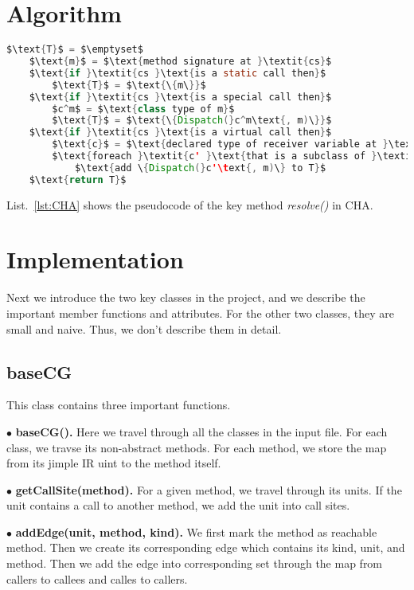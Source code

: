 \documentclass[conference]{IEEEtran}
\begin{document}
\section{Algorithm}
\begin{lstlisting}[label=lst:CHA, caption=Algorithm for resolve method in CHA, language=java, mathescape=true, numbers=none]
    $\text{T}$ = $\emptyset$
    $\text{m}$ = $\text{method signature at }\textit{cs}$
    $\text{if }\textit{cs }\text{is a static call then}$
        $\text{T}$ = $\text{\{m\}}$
    $\text{if }\textit{cs }\text{is a special call then}$
        $c^m$ = $\text{class type of m}$
        $\text{T}$ = $\text{\{Dispatch(}c^m\text{, m)\}}$
    $\text{if }\textit{cs }\text{is a virtual call then}$
        $\text{c}$ = $\text{declared type of receiver variable at }\textit{cs}$
        $\text{foreach }\textit{c' }\text{that is a subclass of }\textit{c }\text{itself do}$
            $\text{add \{Dispatch(}c'\text{, m)\} to T}$
    $\text{return T}$
\end{lstlisting}
List.~\ref{lst:CHA} shows the pseudocode of the key method \textit{resolve()} in CHA.


\section{Implementation}\label{sec:imp}
Next we introduce the two key classes in the project, and we describe the important member functions and attributes.
For the other two classes, they are small and naive. Thus, we don't describe them in detail.

\subsection{baseCG}
This class contains three important functions.

\noindent $\bullet$ \textbf{baseCG(). } Here we travel through all the classes in the input file. For each class, we travse its non-abstract methods. For each method, we store the map from its jimple IR uint to the method itself.

\noindent $\bullet$ \textbf{getCallSite(method). } For a given method, we travel through its units. If the unit contains a call to another method, we add the unit into call sites.

\noindent $\bullet$ \textbf{addEdge(unit, method, kind). } We first mark the method as reachable method. Then we create its corresponding edge which contains its kind, unit, and method. Then we add the edge into corresponding set through the map from callers to callees and calles to callers. 
\end{document}
